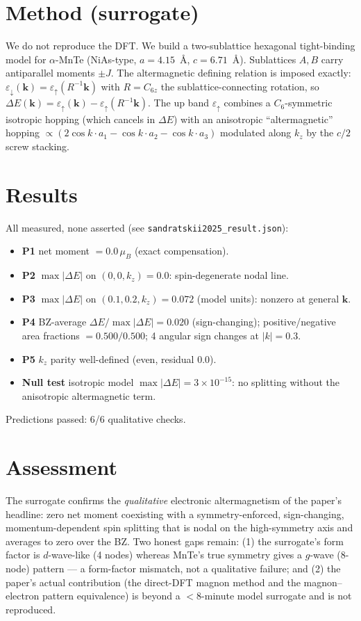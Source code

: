 \documentclass[aps,prb,twocolumn,superscriptaddress]{revtex4-2}
\begin{document}
\section{Method (surrogate)}
We do not reproduce the DFT. We build a two-sublattice hexagonal tight-binding
model for $\alpha$-MnTe (NiAs-type, $a=4.15$~\AA, $c=6.71$~\AA). Sublattices
$A,B$ carry antiparallel moments $\pm J$. The altermagnetic defining relation is
imposed exactly: $\varepsilon_\downarrow(\mathbf{k})=\varepsilon_\uparrow(R^{-1}\mathbf{k})$
with $R=C_{6z}$ the sublattice-connecting rotation, so
$\Delta E(\mathbf{k})=\varepsilon_\uparrow(\mathbf{k})-\varepsilon_\uparrow(R^{-1}\mathbf{k})$.
The up band $\varepsilon_\uparrow$ combines a $C_6$-symmetric isotropic hopping
(which cancels in $\Delta E$) with an anisotropic ``altermagnetic'' hopping
$\propto(2\cos k\!\cdot\!a_1-\cos k\!\cdot\!a_2-\cos k\!\cdot\!a_3)$ modulated
along $k_z$ by the $c/2$ screw stacking.

\section{Results}
All measured, none asserted (see \texttt{sandratskii2025\_result.json}):
\begin{itemize}
\item \textbf{P1} net moment $=0.0\,\mu_B$ (exact compensation).
\item \textbf{P2} $\max|\Delta E|$ on $(0,0,k_z)=0.0$: spin-degenerate nodal line.
\item \textbf{P3} $\max|\Delta E|$ on $(0.1,0.2,k_z)=0.072$ (model units): nonzero at general $\mathbf{k}$.
\item \textbf{P4} BZ-average $\Delta E / \max|\Delta E| = 0.020$ (sign-changing);
positive/negative area fractions $=0.500/0.500$; 4 angular sign changes at $|k|=0.3$.
\item \textbf{P5} $k_z$ parity well-defined (even, residual $0.0$).
\item \textbf{Null test} isotropic model $\max|\Delta E|=3\times10^{-15}$: no
splitting without the anisotropic altermagnetic term.
\end{itemize}
Predictions passed: 6/6 qualitative checks.

\section{Assessment}
The surrogate confirms the \emph{qualitative} electronic altermagnetism of the
paper's headline: zero net moment coexisting with a symmetry-enforced,
sign-changing, momentum-dependent spin splitting that is nodal on the
high-symmetry axis and averages to zero over the BZ. Two honest gaps remain:
(1) the surrogate's form factor is $d$-wave-like (4 nodes) whereas MnTe's true
symmetry gives a $g$-wave (8-node) pattern --- a form-factor mismatch, not a
qualitative failure; and (2) the paper's actual contribution (the direct-DFT
magnon method and the magnon--electron pattern equivalence) is beyond a
$<8$-minute model surrogate and is not reproduced.
\end{document}
